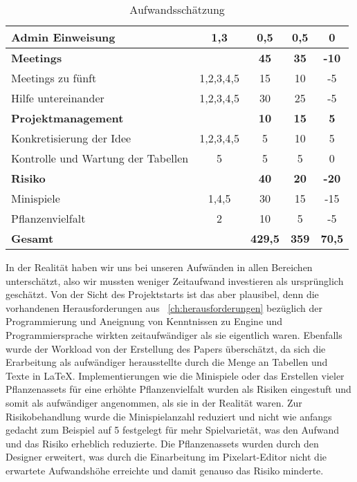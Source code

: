 \begin{table}[H]
\begin{tabular}{|l|c|c|c|c|}
        Admin Einweisung & 1,3 & 0,5 & 0,5 & 0 \\[0.5ex]
        \hline\hline
        \textbf{Meetings} & & \textbf{45} & \textbf{35} & \textbf{-10} \\
        \hline
        Meetings zu fünft & 1,2,3,4,5 & 15 & 10 & -5 \\
        Hilfe untereinander & 1,2,3,4,5 & 30 & 25 & -5 \\[0.5ex]
        \hline\hline
        \textbf{Projektmanagement} & & \textbf{10} & \textbf{15} & \textbf{5} \\
        \hline
        Konkretisierung der Idee & 1,2,3,4,5 & 5 & 10 & 5 \\
        Kontrolle und Wartung der Tabellen & 5 & 5 & 5 & 0 \\[0.5ex]
        \hline\hline
        \textbf{Risiko} & & \textbf{40} & \textbf{20} & \textbf{-20} \\
        \hline
        Minispiele & 1,4,5 & 30 & 15 & -15 \\
        Pflanzenvielfalt & 2 & 10 & 5 & -5 \\[0.5ex]
        \hline\hline
        \textbf{Gesamt} & & \textbf{429,5} & \textbf{359} & \textbf{70,5} \\
        \hline
    \end{tabular}
    \caption{Aufwandsschätzung}
\end{table}
In der Realität haben wir uns bei unseren Aufwänden in allen Bereichen unterschätzt, also wir mussten weniger
Zeitaufwand investieren als ursprünglich geschätzt. 
Von der Sicht des Projektstarts ist das aber plausibel, denn die vorhandenen Herausforderungen aus ~\autoref{ch:herausforderungen} bezüglich der Programmierung und Aneignung von Kenntnissen zu Engine und Programmiersprache
wirkten zeitaufwändiger als sie eigentlich waren.
Ebenfalls wurde der Workload von der Erstellung des Papers überschätzt, da sich die Erarbeitung
als aufwändiger herausstellte durch die Menge an Tabellen und Texte in \LaTeX{}.
Implementierungen wie die Minispiele oder das Erstellen vieler Pflanzenassets für eine erhöhte Pflanzenvielfalt wurden 
als Risiken eingestuft und somit als aufwändiger angenommen, als sie in der Realität waren. 
Zur Risikobehandlung wurde die Minispielanzahl reduziert und nicht wie anfangs gedacht zum Beispiel auf 5 
festgelegt für mehr Spielvarietät, was den Aufwand und das Risiko erheblich reduzierte.
Die Pflanzenassets wurden durch den Designer erweitert, was durch die Einarbeitung im Pixelart-Editor 
nicht die erwartete Aufwandshöhe erreichte und damit genauso das Risiko minderte.\\ 